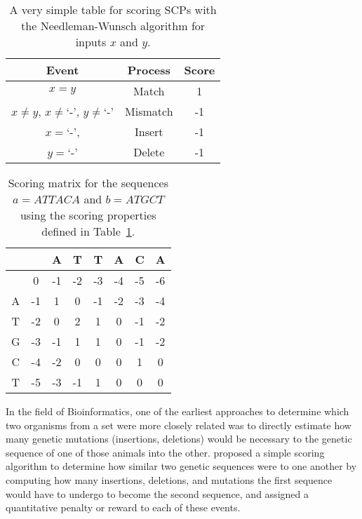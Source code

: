 \begin{table}
\begin{center}

\begin{tabular}{ c c c}
 \textbf{Event}&\textbf{Process} & \textbf{Score} \\ 
 \hline
 $x=y$ & Match & 1 \\
 $x\neq y$, $x \neq $`-', $y \neq $`-' & Mismatch & -1 \\
 $x=$`-',& Insert & -1 \\
 $y=$`-'& Delete & -1
\end{tabular}
\caption{A very simple table for scoring SCPs with the Needleman-Wunsch algorithm for inputs $x$ and $y$.}
\label{tbl:simpleneed}

\end{center}
\end{table}

\begin{table}
\begin{center}
\begin{tabular}{c | c c c c c c c }
 & & A & T & T & A & C & A\\
 \hline
 & 0 & -1 & -2 & -3 & -4 & -5 & -6\\
A & -1 & 1 & 0 & -1 & -2 & -3 & -4\\
T & -2 & 0 & 2 & 1 & 0 & -1 & -2\\
G & -3 & -1 & 1 & 1 & 0 & -1 & -2\\
C & -4 & -2 & 0 & 0 & 0 & 1 & 0\\
T & -5 & -3 & -1 & 1 & 0 & 0 & 0
\end{tabular}
\caption{Scoring matrix for the sequences $a=ATTACA$ and $b=ATGCT$ using the scoring properties defined in Table~\ref{tbl:simpleneed}.}
\label{tbl:NW_nucleotides}
\end{center}
\end{table}


In the field of Bioinformatics, one of the earliest approaches to determine which two organisms from a set were more closely related was to directly estimate how many genetic mutations (insertions, deletions) would be necessary to the genetic sequence of one of those animals into the other. \cite{needleman1970general} proposed a simple scoring algorithm to determine how similar two genetic sequences were to one another by computing how many insertions, deletions, and mutations the first sequence would have to undergo to become the second sequence, and assigned a quantitative penalty or reward to each of these events. 

